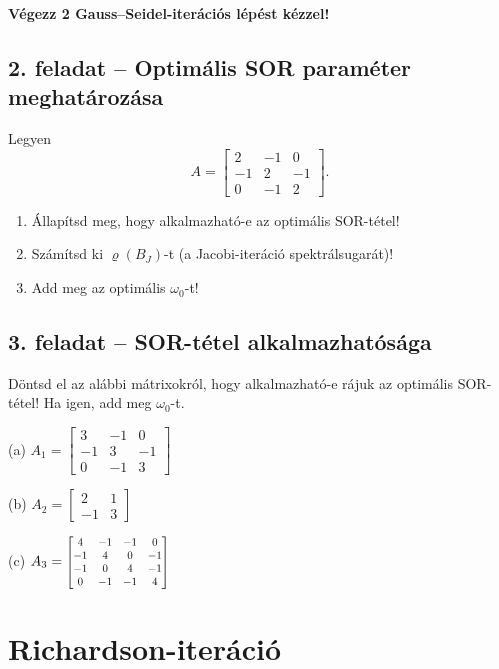 \documentclass[a4paper,12pt]{article}
\begin{document}
\textbf{Végezz 2 Gauss--Seidel-iterációs lépést kézzel!}



\subsection*{2. feladat -- Optimális SOR paraméter meghatározása}

Legyen
$$A = \begin{bmatrix}2&-1&0\\-1&2&-1\\0&-1&2\end{bmatrix}.$$

\begin{enumerate}[noitemsep,topsep=2pt]
  \item Állapítsd meg, hogy alkalmazható-e az optimális SOR-tétel!
  \item Számítsd ki $\varrho(B_J)$-t (a Jacobi-iteráció spektrálsugarát)!
  \item Add meg az optimális $\omega_0$-t!
\end{enumerate}


\subsection*{3. feladat -- SOR-tétel alkalmazhatósága}

Döntsd el az alábbi mátrixokról, hogy alkalmazható-e rájuk az optimális SOR-tétel!
Ha igen, add meg $\omega_0$-t.

(a) $A_1 = \begin{bmatrix}3&-1&0\\-1&3&-1\\0&-1&3\end{bmatrix}$

(b) $A_2 = \begin{bmatrix}2&1\\-1&3\end{bmatrix}$

(c) $A_3 = \scalebox{0.78}{$\begin{bmatrix}4&-1&-1&0\\-1&4&0&-1\\-1&0&4&-1\\0&-1&-1&4\end{bmatrix}$}$


\section{Richardson-iteráció}
\end{document}
